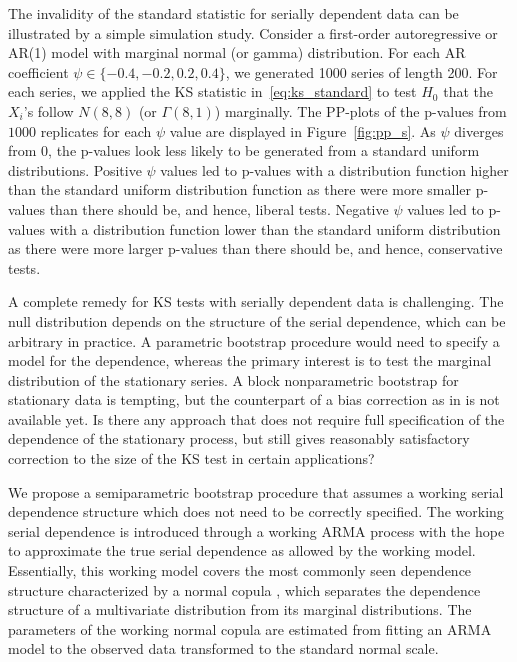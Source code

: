 \documentclass[12pt, letterpaper]{article}
\begin{document}
The invalidity of the standard statistic for serially dependent data can be
illustrated by a simple simulation study. Consider a first-order autoregressive
or AR(1) model with marginal normal (or gamma) distribution. For each AR
coefficient $\psi \in \{-0.4, -0.2, 0.2, 0.4\}$, we generated 1000
series of length 200. For each series, we applied the KS statistic
in~\eqref{eq:ks_standard} to test $H_0$ that the $X_i$'s follow $N(8, 8)$ (or 
$\Gamma(8,1)$) marginally. The PP-plots of the p-values from $1000$ replicates 
for each $\psi$ value are displayed in Figure~\ref{fig:pp_s}. As 
$\psi$ diverges from 0, the p-values look less likely to be generated from a 
standard uniform distributions. Positive $\psi$ values led to p-values with a 
distribution function higher than the standard uniform distribution function as 
there were more smaller p-values than there should be, and hence, 
liberal tests. Negative $\psi$ values led to p-values with a 
distribution function lower than the standard uniform distribution as there 
were more larger p-values than there should be, and hence, conservative tests.


A complete remedy for KS tests with serially dependent data is
challenging. The null distribution depends on the structure of the serial
dependence, which can be arbitrary in practice. A parametric bootstrap procedure
would need to specify a model for the dependence, whereas the primary interest
is to test the marginal distribution of the stationary series. A block
nonparametric bootstrap for stationary data \citep{kunsch1989jackknife} is
tempting, but the counterpart of a bias correction as in
\citet{babu2004goodness} is not available yet. Is there any approach that does
not require full specification of the dependence of the stationary process,
but still gives reasonably satisfactory correction to the size of the KS test in
certain applications?


We propose a semiparametric bootstrap procedure that assumes a working serial
dependence structure which does not need to be correctly specified. The working
serial dependence is introduced through a working ARMA process with the hope to
approximate the true serial dependence as allowed by the working
model. Essentially, this working model covers the most commonly seen dependence
structure characterized by a normal copula \citep{hofert2018elements}, which
separates the dependence structure
of a multivariate distribution from its marginal distributions. 
The parameters of the working normal copula are
estimated from fitting an ARMA model to the
observed data transformed to the standard normal scale.
\end{document}

